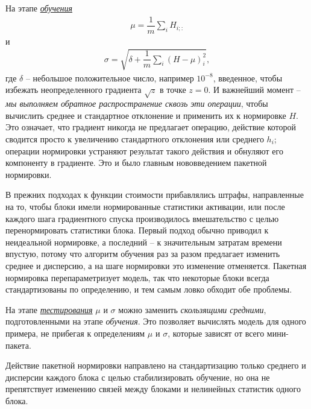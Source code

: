 \documentclass[%
	11pt,
	a4paper,
	utf8,
]{article}
\begin{document}
На этапе \underline{\itshape обучения}
\begin{align*}
	\mu = \dfrac{1}{m}\sum_i H_{i; :}
\end{align*}
и
\begin{align*}
	\sigma = \sqrt{ \delta +\dfrac{1}{m} \sum_i (H - \mu)^2_i },
\end{align*}
где $ \delta $ -- небольшое положительное число, например $ 10^{-8} $, введенное, чтобы избежать неопределенного градиента $ \sqrt{z} $ в точке $ z = 0 $. И важнейший момент -- \emph{мы выполняем обратное распространение сквозь эти операции}, чтобы вычислить среднее и стандартное отклонение и применить их к нормировке $ H $. Это означает, что градиент никогда не предлагает операцию, действие которой сводится просто к увеличению стандартного отклонения или среднего $ h_{i} $; операции нормировки устраняют результат такого действия и обнуляют его компоненту в градиенте. Это и было главным нововведением пакетной нормировки. 

В прежних подходах к функции стоимости прибавлялись штрафы, направленные на то, чтобы блоки имели нормированные статистики активации, или после каждого шага градиентного спуска производилось вмешательство с целью перенормировать статистики блока. Первый подход обычно приводил к неидеальной нормировке, а последний -- к значительным затратам времени впустую, потому что алгоритм обучения раз за разом предлагает изменить среднее и дисперсию, а на шаге нормировки это изменение отменяется. Пакетная нормировка перепараметризует модель, так что некоторые блоки всегда стандартизованы по определению, и тем самым ловко обходит обе проблемы.

На этапе \underline{\itshape тестирования} $ \mu $ и $ \sigma $ можно заменить \emph{скользящими средними}, подготовленными на этапе \emph{обучения}. Это позволяет вычислять модель для одного примера, не прибегая к определениям $ \mu $ и $ \sigma $, которые зависят от всего мини-пакета. 

Действие пакетной нормировки направлено на стандартизацию только среднего и дисперсии каждого блока с целью стабилизировать обучение, но она не препятствует изменению связей между блоками и нелинейных статистик одного блока.
\end{document}
